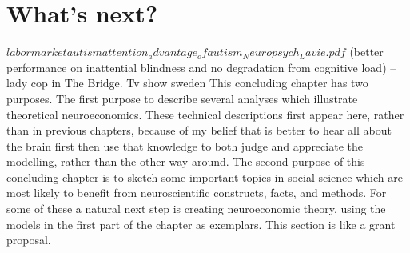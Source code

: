 \documentclass{article}
\begin{document}
\section{What’s next?} 
$labor market autism  attention_advantage_ofautism_Neuropsych_Lavie.pdf$  (better performance on inattential blindness and no degradation from cognitive load) – lady cop in The Bridge. Tv show sweden
This concluding chapter has two purposes. The first purpose to describe several analyses which illustrate theoretical neuroeconomics. These technical descriptions first appear here, rather than in previous chapters, because of my belief that is better to hear all about the brain first then use that knowledge to both judge and appreciate the modelling, rather than the other way around.  
The second purpose of this concluding chapter is to sketch some important topics in social science which are most likely to benefit from neuroscientific constructs, facts, and methods. For some of these a natural next step is creating neuroeconomic theory, using the models in the first part of the chapter as exemplars. This section is like  a grant proposal.  
\end{document}
